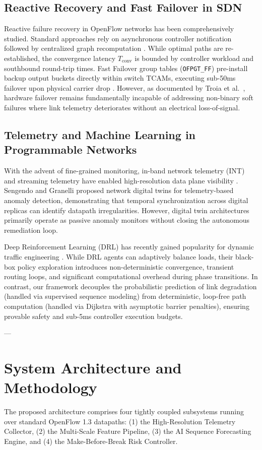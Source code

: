 \documentclass[journal,10pt,twocolumn]{IEEEtran}
\begin{document}
\subsection{Reactive Recovery and Fast Failover in SDN}
Reactive failure recovery in OpenFlow networks has been comprehensively studied. Standard approaches rely on asynchronous controller notification followed by centralized graph recomputation \cite{mckeown2008openflow}. While optimal paths are re-established, the convergence latency $T_{\text{conv}}$ is bounded by controller workload and southbound round-trip times. Fast Failover group tables (\texttt{OFPGT\_FF}) pre-install backup output buckets directly within switch TCAMs, executing sub-50ms failover upon physical carrier drop \cite{openflow13spec}. However, as documented by Troia et al.\ \cite{troia2025inband}, hardware failover remains fundamentally incapable of addressing non-binary soft failures where link telemetry deteriorates without an electrical loss-of-signal.

\subsection{Telemetry and Machine Learning in Programmable Networks}
With the advent of fine-grained monitoring, in-band network telemetry (INT) and streaming telemetry have enabled high-resolution data plane visibility \cite{troia2025inband}. Sengendo and Granelli \cite{sengendo2026digital} proposed network digital twins for telemetry-based anomaly detection, demonstrating that temporal synchronization across digital replicas can identify datapath irregularities. However, digital twin architectures primarily operate as passive anomaly monitors without closing the autonomous remediation loop. 

Deep Reinforcement Learning (DRL) has recently gained popularity for dynamic traffic engineering \cite{wu2026dynamic}. While DRL agents can adaptively balance loads, their black-box policy exploration introduces non-deterministic convergence, transient routing loops, and significant computational overhead during phase transitions. In contrast, our framework decouples the probabilistic prediction of link degradation (handled via supervised sequence modeling) from deterministic, loop-free path computation (handled via Dijkstra with asymptotic barrier penalties), ensuring provable safety and sub-5ms controller execution budgets.

---

\section{System Architecture and Methodology}
\label{sec:architecture}
The proposed architecture comprises four tightly coupled subsystems running over standard OpenFlow 1.3 datapaths: (1) the High-Resolution Telemetry Collector, (2) the Multi-Scale Feature Pipeline, (3) the AI Sequence Forecasting Engine, and (4) the Make-Before-Break Risk Controller.
\end{document}
